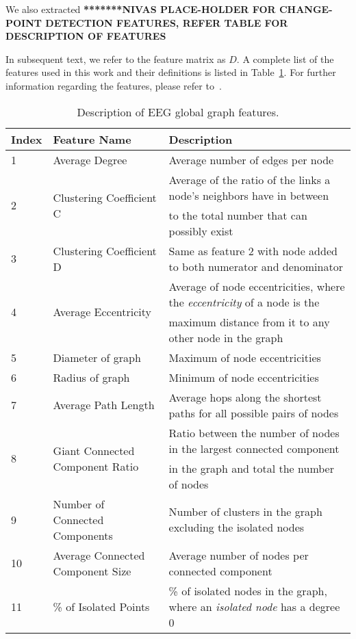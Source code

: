 \documentclass{article} %
\theoremstyle{definition}
\theoremstyle{remark}
\begin{document}
We also extracted \textbf{*******NIVAS PLACE-HOLDER FOR CHANGE-POINT DETECTION FEATURES, REFER TABLE FOR DESCRIPTION OF FEATURES}

In subsequent text, we refer to the feature matrix as $D$.  A complete list of the features used in this work and their definitions is listed in Table~\ref{tab:features}.  For further information regarding the features, please refer to~\cite{bilgin_multiscale}. 

\begin{table}[htb]
\caption{Description of EEG global graph features.}\label{tab:features}
\renewcommand{\arraystretch}{0.8} %

\begin{tabular}{lll}
Index&Feature Name& Description\\
\hline
\hline
1&Average Degree&Average number of edges per node\\
\multirow{2}{*}{2}&\multirow{2}{*}{Clustering Coefficient C} &Average of the ratio of the links a node's neighbors have in between\\
&&to the total number that can possibly exist\\
3&Clustering Coefficient D & Same as feature $2$ with node added to both numerator and denominator\\
\multirow{2}{*}{4}&\multirow{2}{*}{Average Eccentricity} & Average of node eccentricities, where the {\em eccentricity} of a node is the\\
&&maximum distance from it to any other node in the graph\\
5&Diameter of graph& Maximum of node eccentricities\\
6&Radius of graph& Minimum of node eccentricities\\
7&Average Path Length &Average hops along the shortest paths for all possible pairs of nodes\\
\multirow{2}{*}{8}&\multirow{2}{*}{Giant Connected Component Ratio}& Ratio between the number of nodes in the largest connected component\\ && in the graph and total
the number of nodes\\
9&Number of Connected Components&Number of clusters in the graph excluding the isolated nodes\\
10&Average Connected Component Size&Average number of nodes per connected component \\
11&\% of Isolated Points&\% of isolated nodes in the graph, where an {\em isolated node} has a degree 0\\

\end{tabular}
\end{table}
\end{document}
